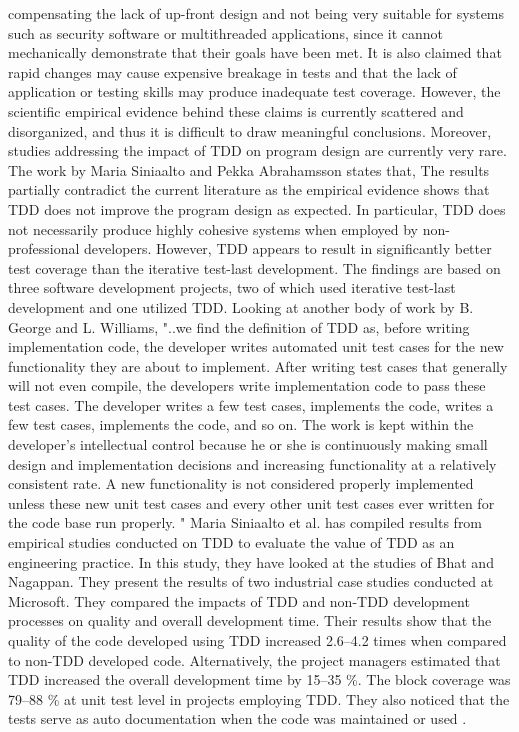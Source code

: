 \documentclass[conference]{IEEEtran}
\begin{document}
compensating the lack of up-front design and not being
very suitable for systems such as security software or
multithreaded applications, since it cannot mechanically
demonstrate that their goals have been met\cite{b12}. It is also
claimed that rapid changes may cause expensive
breakage in tests and that the lack of application or
testing skills may produce inadequate test coverage\cite{b13}. However, the scientific empirical evidence behind these
claims is currently scattered and disorganized, and thus it
is difficult to draw meaningful conclusions. Moreover,
studies addressing the impact of TDD on program design
are currently very rare\cite{b6}.
The work by Maria Siniaalto and Pekka Abrahamsson states that, The results partially contradict the current literature as the empirical evidence shows that TDD does not improve the program design as expected. In particular, TDD does
not necessarily produce highly cohesive systems when employed by non-professional developers. However, TDD appears to result in significantly better test coverage than the iterative test-last development. The findings are based on three software development projects, two of which used iterative test-last development and one utilized TDD\cite{b6}.\newline
Looking at another body of work by B. George and L. Williams, "..we find the definition of TDD as, before writing implementation code, the developer writes automated unit test cases for the new functionality they are about to implement. After writing test cases that generally will not even compile, the developers write implementation code to pass these test cases. The developer writes a few test cases, implements the code, writes a few test cases, implements the code, and so on. The work is kept within the developer’s intellectual control because
he or she is continuously making small design and implementation
decisions and increasing functionality at a relatively consistent rate. A new functionality is not considered properly implemented unless these new unit test cases and every other unit test cases ever written for the code base run properly.
"\cite{c1}
Maria Siniaalto et al. has compiled results from empirical studies conducted on TDD to evaluate the value of TDD as an engineering practice. In this study, they have looked at the studies of Bhat and Nagappan. They present the results of two
industrial case studies conducted at Microsoft. They
compared the impacts of TDD and non-TDD
development processes on quality and overall
development time. Their results show that the quality of
the code developed using TDD increased 2.6–4.2 times
when compared to non-TDD developed code.
Alternatively, the project managers estimated that TDD
increased the overall development time by 15–35 \%. The
block coverage was 79–88 \% at unit test level in projects
employing TDD. They also noticed that the tests serve as
auto documentation when the code was maintained or
used \cite{c2}. 
\end{document}
